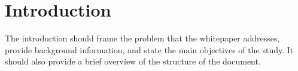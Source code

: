 \section{Introduction}
\label{sec:introduction}
The introduction should frame the problem that the whitepaper addresses, provide background information, and state the main objectives of the study. It should also provide a brief overview of the structure of the document.
